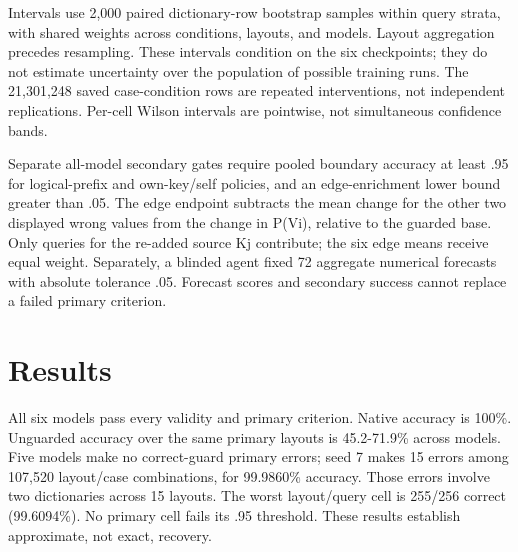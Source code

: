 \documentclass[10pt,letterpaper]{article}
\begin{document}
Intervals use 2,000 paired dictionary-row bootstrap samples within query strata, with shared weights across conditions, layouts, and models. Layout aggregation precedes resampling. These intervals condition on the six checkpoints; they do not estimate uncertainty over the population of possible training runs. The 21,301,248 saved case-condition rows are repeated interventions, not independent replications. Per-cell Wilson intervals are pointwise, not simultaneous confidence bands.

Separate all-model secondary gates require pooled boundary accuracy at least .95 for logical-prefix and own-key/self policies, and an edge-enrichment lower bound greater than .05. The edge endpoint subtracts the mean change for the other two displayed wrong values from the change in P(Vi), relative to the guarded base. Only queries for the re-added source Kj contribute; the six edge means receive equal weight. Separately, a blinded agent fixed 72 aggregate numerical forecasts with absolute tolerance .05. Forecast scores and secondary success cannot replace a failed primary criterion.

\section{Results}
All six models pass every validity and primary criterion. Native accuracy is 100\%. Unguarded accuracy over the same primary layouts is 45.2-71.9\% across models. Five models make no correct-guard primary errors; seed 7 makes 15 errors among 107,520 layout/case combinations, for 99.9860\% accuracy. Those errors involve two dictionaries across 15 layouts. The worst layout/query cell is 255/256 correct (99.6094\%). No primary cell fails its .95 threshold. These results establish approximate, not exact, recovery.
\end{document}
